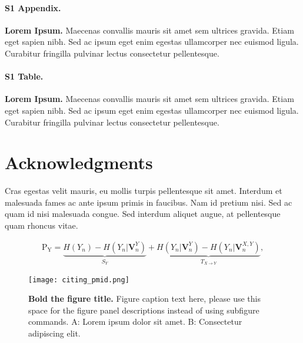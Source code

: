\documentclass[10pt,letterpaper]{article}
\begin{document}
\paragraph*{S1 Appendix.}
\label{S1_Appendix}
{\bf Lorem Ipsum.} Maecenas convallis mauris sit amet sem ultrices gravida. Etiam eget sapien nibh. Sed ac ipsum eget enim egestas ullamcorper nec euismod ligula. Curabitur fringilla pulvinar lectus consectetur pellentesque.

\paragraph*{S1 Table.}
\label{S1_Table}
{\bf Lorem Ipsum.} Maecenas convallis mauris sit amet sem ultrices gravida. Etiam eget sapien nibh. Sed ac ipsum eget enim egestas ullamcorper nec euismod ligula. Curabitur fringilla pulvinar lectus consectetur pellentesque.

\section*{Acknowledgments}
Cras egestas velit mauris, eu mollis turpis pellentesque sit amet. Interdum et malesuada fames ac ante ipsum primis in faucibus. Nam id pretium nisi. Sed ac quam id nisi malesuada congue. Sed interdum aliquet augue, at pellentesque quam rhoncus vitae.

\begin{eqnarray}
\label{eq:schemeP} 
	\mathrm{P_Y} = \underbrace{H(Y_n) - H(Y_n|\mathbf{V}^{Y}_{n})}_{S_Y} + \underbrace{H(Y_n|\mathbf{V}^{Y}_{n})- H(Y_n|\mathbf{V}^{X,Y}_{n})}_{T_{X\rightarrow Y}},
\end{eqnarray}

\nolinenumbers

\begin{figure}[!h]
\caption{{\bf Bold the figure title.}
Figure caption text here, please use this space for the figure panel descriptions instead of using subfigure commands. A: Lorem ipsum dolor sit amet. B: Consectetur adipiscing elit.}
\texttt{[image: citing\_pmid.png]}
\label{fig2}
\end{figure}
\end{document}
